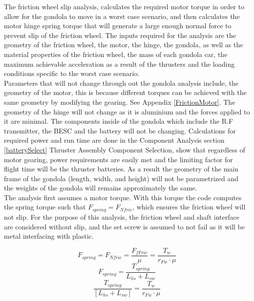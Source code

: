\documentclass[../main.tex]{subfiles}
\begin{document}
The friction wheel slip analysis, calculates the required motor torque in order to allow for the gondola to move in a worst case scenario, and then calculates the motor hinge spring torque that will generate a large enough normal force to prevent slip of the friction wheel. The inputs required for the analysis are the geometry of the friction wheel, the motor, the hinge, the gondola, as well as the material properties of the friction wheel, the mass of each gondola car, the maximum achievable acceleration as a result of the thrusters and the loading conditions specific to the worst case scenario. \\

Parameters that will not change through out the gondola analysis include, the geometry of the motor, this is because different torques can be achieved with the same geometry by modifying the gearing. See Appendix \ref{FrictionMotor}. The geometry of the hinge will not change as it is aluminium and the forces applied to it are minimal. The components inside of the gondola which include the R.F transmitter, the BESC and the battery will not be changing. Calculations for required power and run time are done in the Component Analysis section \ref{batterySelect} Thruster Assembly Component Selection, show that regardless of motor gearing, power requirements are easily met and the limiting factor for flight time will be the thruster batteries. As a result the geometry of the main frame of the gondola (length, width, and height) will not be parametrized and the weights of the gondola will remains approximately the same. \\

The analysis first assumes a motor torque. With this torque the code computes the spring torque such that $F_{spring} = F_{Nfric}$, which ensures the friction wheel will not slip. For the purpose of this analysis, the friction wheel and shaft interface are considered without slip, and the set screw is assumed to not fail as it will be metal interfacing with plastic.

\begin{equation}
F_{spring} = F_{Nfric} = \frac{F_{fFric}}{\mu} = \frac{T_w}{r_{Fw}\cdot{}\mu}
\end{equation}
\begin{equation}
\label{eqn:springForce}
F_{spring} = \frac{T_{spring}}{L_{hs}+L_{sw}}
\end{equation}
\begin{equation}
\frac{T_{spring}}{[L_{hs}+L_{sw}]} = \frac{T_w}{r_{Fw}\cdot{}\mu}
\end{equation}
\end{document}
